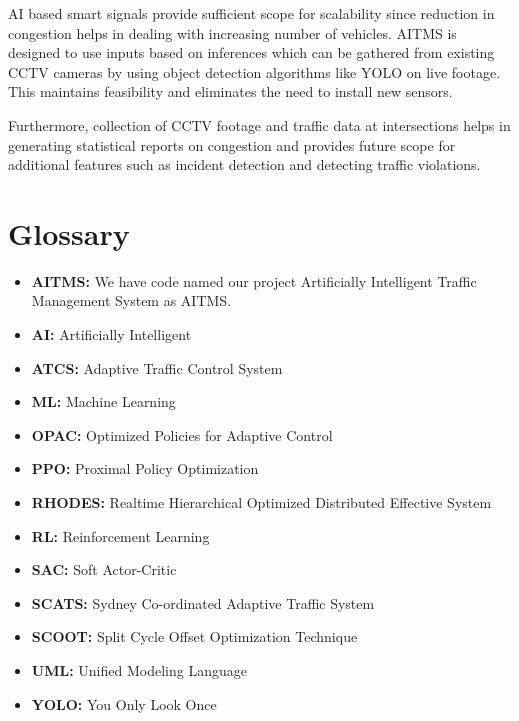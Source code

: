 \documentclass[openany,12pt]{report}
\begin{document}
	\hspace*{0.5in}AI based smart signals provide sufficient scope for scalability since reduction in congestion helps in dealing with increasing number of vehicles. AITMS is designed to use inputs based on inferences which can be gathered from existing CCTV cameras by using object detection algorithms like YOLO on live footage. This maintains feasibility and eliminates the need to install new sensors.

	\hspace*{0.5in}Furthermore, collection of CCTV footage and traffic data at intersections helps in generating statistical reports on congestion and provides future scope for additional features such as incident detection and detecting traffic violations.
	
		
		
		\appendix
		\cleardoublepage
		
		\chapter{Glossary}
		\begin{itemize}
			\item{\textbf{AITMS:}} We have code named our project Artificially Intelligent Traffic Management System as AITMS.
			\item{\textbf {AI:}} Artificially Intelligent
			\item{\textbf {ATCS:}} Adaptive Traffic Control System
			\item{\textbf {ML:}} Machine Learning
			\item{\textbf {OPAC:}} Optimized Policies for Adaptive Control			
			\item{\textbf {PPO:}} Proximal Policy Optimization
			\item{\textbf {RHODES:}} Realtime Hierarchical Optimized Distributed Effective System
			\item{\textbf {RL:}} Reinforcement Learning
			\item{\textbf {SAC:}} Soft Actor-Critic
			\item{\textbf {SCATS:}} Sydney Co-ordinated Adaptive Traffic System
			\item{\textbf {SCOOT:}} Split Cycle Offset Optimization Technique
			\item{\textbf {UML:}} Unified Modeling Language
			\item{\textbf {YOLO:}} You Only Look Once
			
		\end{itemize}
		
\end{document}
